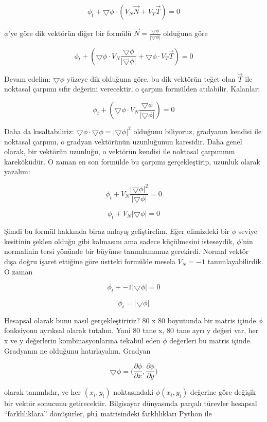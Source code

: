 \documentclass[12pt,fleqn]{article}\usepackage{../../common}
\begin{document}
$$ \phi_t + \bigtriangledown \phi \cdot (V_N\vec{N} + V_T\vec{T}) = 0 $$

$\phi$'ye göre dik vektörün diğer bir formülü $\vec{N} =
\frac{\bigtriangledown\phi}{|\bigtriangledown\phi|}$ olduğuna göre

$$ \phi_t + (\bigtriangledown \phi \cdot
V_N\frac{\bigtriangledown\phi}{|\bigtriangledown\phi|} + \bigtriangledown
\phi \cdot V_T\vec{T}) = 0 $$

Devam edelim: $\bigtriangledown \phi$ yüzeye dik olduğuna göre, bu dik vektörün
teğet olan $\vec{T}$ ile noktasal çarpımı sıfır değerini verecektir, o çarpım
formülden atılabilir. Kalanlar:

$$ \phi_t + (\bigtriangledown \phi \cdot 
V_N\frac{\bigtriangledown\phi}{|\bigtriangledown\phi|}) = 0 $$

Daha da kısaltabiliriz: $\bigtriangledown \phi \cdot \bigtriangledown \phi
= |\bigtriangledown \phi|^2$ olduğunu biliyoruz, gradyanın kendisi ile
noktasal çarpımı, o gradyan vektörünün uzunluğunun karesidir. Daha genel
olarak, bir vektörün uzunluğu, o vektörün kendisi ile noktasal çarpımının
kareköküdür. O zaman en son formülde bu çarpımı gerçekleştirip, uzunluk
olarak yazalım:

$$ \phi_t + V_N\frac{|\bigtriangledown\phi|^2}{|\bigtriangledown\phi|} = 0  $$

$$ \phi_t + V_N |\bigtriangledown\phi| = 0  $$

Şimdi bu formül hakkında biraz anlayış geliştirelim. Eğer elimizdeki
bir $\phi$ seviye kesitinin şeklen olduğu gibi kalmasını ama sadece
küçülmesini isteseydik, $\phi$'nin normalinin tersi yönünde bir büyüme
tanımlamamız gerekirdi. Normal vektör dışa doğru işaret ettiğine göre
üstteki formülde mesela $V_N = -1$ tanımlayabilirdik. O zaman

$$ \phi_t + -1 |\bigtriangledown\phi| = 0 $$

$$ \phi_t = |\bigtriangledown\phi|   $$

Hesapsal olarak bunu nasıl gerçekleştiririz? 80 x 80 boyutunda bir
matris içinde $\phi$ fonksiyonu ayrıksal olarak tutalım. Yani 80 tane
x, 80 tane ayrı y değeri var, her x ve y değerlerin kombinasyonlarına
tekabül eden $\phi$ değerleri bu matris içinde. Gradyanın ne olduğunu
hatırlayalım. Gradyan

$$ 
\bigtriangledown \phi = \bigg(
\frac{\partial \phi}{\partial x},
\frac{\partial \phi}{\partial y} \bigg)
$$

olarak tanımlıdır, ve her $(x_i,y_i)$ noktasındaki $\phi(x_i,y_i)$
değerine göre değişik bir vektör sonucunu getirecektir. Bilgisayar
dünyasında parçalı türevler hesapsal ``farklılıklara'' dönüşürler,
\verb!phi! matrisindeki farklılıkları Python ile
\end{document}
